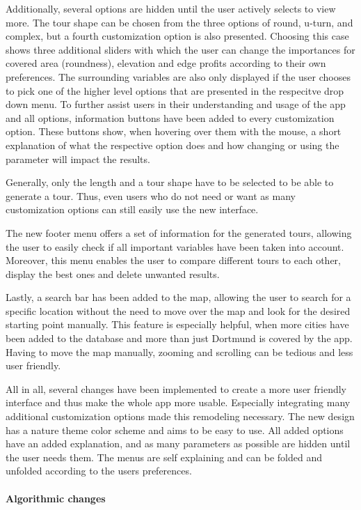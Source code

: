 Additionally, several options are hidden until the user actively selects to view more. 
The tour shape can be chosen from the three options of round, u-turn, and complex, but a fourth customization option is also presented.
Choosing this case shows three additional sliders with which the user can change the importances for covered area (roundness), elevation and edge profits according to their own preferences.
The surrounding variables are also only displayed if the user chooses to pick one of the higher level options that are presented in the respecitve drop down menu.
To further assist users in their understanding and usage of the app and all options, information buttons have been added to every customization option.
These buttons show, when hovering over them with the mouse, a short explanation of what the respective option does and how changing or using the parameter will impact the results.

Generally, only the length and a tour shape have to be selected to be able to generate a tour.
Thus, even users who do not need or want as many customization options can still easily use the new interface.


The new footer menu offers a set of information for the generated tours, allowing the user to easily check if all important variables have been taken into account. 
Moreover, this menu enables the user to compare different tours to each other, display the best ones and delete unwanted results.


Lastly, a search bar has been added to the map, allowing the user to search for a specific location without the need to move over the map and look for the desired starting point manually.
This feature is especially helpful, when more cities have been added to the database and more than just Dortmund is covered by the app.
Having to move the map manually, zooming and scrolling can be tedious and less user friendly.


All in all, several changes have been implemented to create a more user friendly interface and thus make the whole app more usable.
Especially integrating many additional customization options made this remodeling necessary.
The new design has a nature theme color scheme and aims to be easy to use.
All added options have an added explanation, and as many parameters as possible are hidden until the user needs them.
The menus are self explaining and can be folded and unfolded according to the users preferences.


\paragraph{Algorithmic changes}

